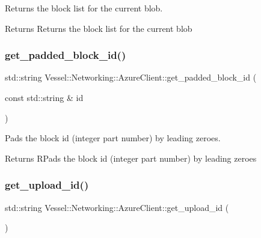 Returns the block list for the current blob. 

\begin{DoxyReturn}{Returns}
Returns the block list for the current blob 
\end{DoxyReturn}
\mbox{\label{class_vessel_1_1_networking_1_1_azure_client_ae2c4d287ee5c326380c426a91dae7b23}} 
\subsubsection{\texorpdfstring{get\+\_\+padded\+\_\+block\+\_\+id()}{get\_padded\_block\_id()}}
{\footnotesize\ttfamily std\+::string Vessel\+::\+Networking\+::\+Azure\+Client\+::get\+\_\+padded\+\_\+block\+\_\+id (\begin{DoxyParamCaption}\item[{const std\+::string \&}]{id }\end{DoxyParamCaption})}



Pads the block id (integer part number) by leading zeroes. 

\begin{DoxyReturn}{Returns}
R\+Pads the block id (integer part number) by leading zeroes 
\end{DoxyReturn}
\mbox{\label{class_vessel_1_1_networking_1_1_azure_client_a74e4cfe536c3099aadf1c8df785f53d4}} 
\subsubsection{\texorpdfstring{get\+\_\+upload\+\_\+id()}{get\_upload\_id()}}
{\footnotesize\ttfamily std\+::string Vessel\+::\+Networking\+::\+Azure\+Client\+::get\+\_\+upload\+\_\+id (\begin{DoxyParamCaption}{ }\end{DoxyParamCaption})}



